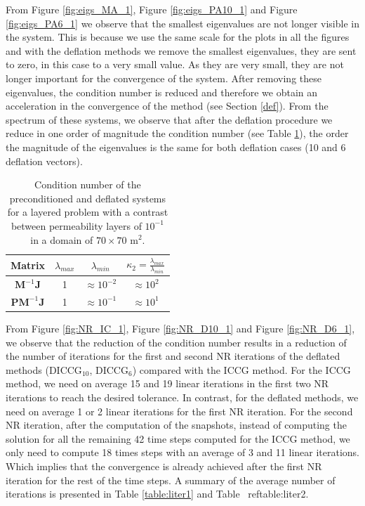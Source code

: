\documentclass[12pt]{article}
\begin{document}
From Figure \ref{fig:eigs_MA_1}, Figure \ref{fig:eigs_PA10_1} and Figure \ref{fig:eigs_PA6_1} we observe that the smallest eigenvalues are not longer visible in the system. This is because we use the same scale for the plots in all the figures and with the deflation methods we remove the smallest eigenvalues, they are sent to zero, in this case to a very small value. As they are very small, they are not longer important for the convergence of the system. After removing these eigenvalues, the condition number is reduced and therefore we obtain an acceleration in the convergence of the method (see Section \ref{def}). From the spectrum of these systems, we observe that after the deflation procedure we reduce in one order of magnitude the condition number (see Table \ref{table:cn_1}), the order the magnitude of the eigenvalues is the same for both deflation cases (10 and 6 deflation vectors).\\

\begin{table}[!ht]\centering
\begin{minipage}{.7\textwidth}
\vspace{-10pt}
\centering
\begin{tabular}{ |c|c|c|c|} 
  \hline
 Matrix &$\lambda_{max}$ &$\lambda_{min}$ &$\kappa_2=\frac{\lambda_{max}}{\lambda_{min}}$  \\
  \hline
$\mathbf{M}^{-1}\mathbf{J}$ &1 & $\approx 10^{-2}$&$\approx 10^2$\\
$\mathbf{P}\mathbf{M}^{-1}\mathbf{J}$ &1 & $\approx 10^{-1}$&$\approx 10^1$\\
 \hline
 \end{tabular}
\caption{Condition number of the preconditioned and deflated systems for a layered problem with a contrast between permeability layers of $10^{-1}$ in a domain of $70 \times 70$ m$^2$.}\label{table:cn_1}
\end{minipage}
\end{table}

From Figure \ref{fig:NR_IC_1},  Figure \ref{fig:NR_D10_1} and Figure \ref{fig:NR_D6_1}, we observe that the reduction of the condition number results in a reduction of the number of iterations for the first and second NR iterations of the deflated methods (DICCG$_{10}$, DICCG$_6$) compared with the ICCG method. For the ICCG method, we need on average 15 and 19 linear iterations in the first two NR iterations to reach the desired tolerance. In contrast, for the deflated methods, we need on average 1 or 2 linear iterations for the first NR iteration. For the second NR iteration, after the computation of the snapshots, instead of computing the solution for all the remaining 42 time steps computed for the ICCG method, we only need to compute 18 times steps with an average of 3 and 11 linear iterations. Which implies that the convergence is already achieved after the first NR iteration for the rest of the time steps. A summary of the average number of iterations is presented in Table \ref{table:liter1} and Table \
ref{table:liter2}.\\
\end{document}
